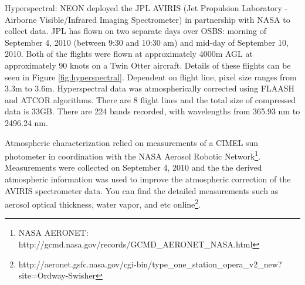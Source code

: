 \documentclass[remotesensing,article,accept,moreauthors,pdftex,12pt,a4paper]{mdpi}
\begin{document}
Hyperspectral: NEON deployed the JPL AVIRIS (Jet Propulsion Laboratory - Airborne Visible/Infrared Imaging Spectrometer) in partnership with NASA to collect data. JPL has flown on two separate days over OSBS: morning of September 4, 2010 (between 9:30 and 10:30 am) and mid-day of September 10, 2010. Both of the flights were flown at approximately 4000m AGL at approximately 90 knots on a Twin Otter aircraft. Details of these flights can be seen in Figure \ref{fig:hyperspectral}. Dependent on flight line, pixel size ranges from 3.3m to 3.6m. Hyperspectral data was atmospherically corrected using FLAASH \cite{adler1998flaash} and ATCOR \cite{richter2005atmospheric} algorithms. There are 8 flight lines and the total size of compressed data is 33GB. There are 224 bands recorded, with wavelengths from 365.93 nm to 2496.24 nm.

Atmospheric characterization relied on measurements of a CIMEL sun photometer in coordination with the NASA Aerosol Robotic Network\footnote{NASA AERONET: http://gcmd.nasa.gov/records/GCMD\_AERONET\_NASA.html}. Measurements were collected on September 4, 2010 and the the derived atmospheric information was used to improve the atmospheric correction of the AVIRIS spectrometer data. You can find the detailed measurements such as aerosol optical thickness, water vapor, and etc online\footnote{http://aeronet.gsfc.nasa.gov/cgi-bin/type\_one\_station\_opera\_v2\_new?site=Ordway-Swisher}.
 
\end{document}

